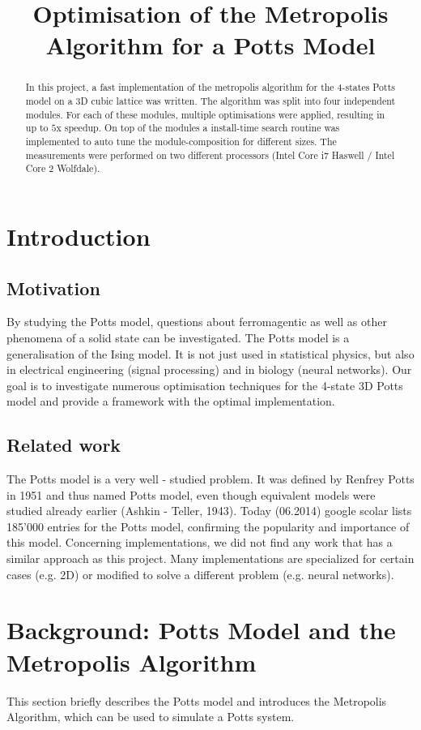 \documentclass[letterpaper]{article}
\title{Optimisation of the Metropolis Algorithm for a Potts Model}
\begin{document}
%
\maketitle
%


\begin{abstract}
In this project, a fast implementation of the metropolis algorithm for the 4-states Potts model on a 3D cubic lattice was written. The algorithm was split into four independent modules. For each of these modules, multiple optimisations were applied, resulting in up to $5$x speedup. On top of the modules a install-time search routine was implemented to auto tune the module-composition for different sizes. The measurements were performed on two different processors (Intel Core i7 Haswell / Intel Core 2 Wolfdale). 
\end{abstract}

\section{Introduction}\label{sec:intro}
\subsection{Motivation} 
By studying the Potts model, questions about ferromagentic as well as other phenomena of a solid state can be investigated. The Potts model is a generalisation of the Ising model. It is not just used in statistical physics, but also in electrical engineering (signal processing) and in biology (neural networks). Our goal is to investigate numerous optimisation techniques for the 4-state 3D Potts model and provide a framework with the optimal implementation. 
\subsection{Related work}
The Potts model is a very well - studied problem. It was defined by Renfrey Potts in 1951 and thus named Potts model, even though equivalent models were studied already earlier (Ashkin - Teller, 1943). Today (06.2014) google scolar lists 185'000 entries for the Potts model, confirming the popularity and importance of this model. Concerning implementations, we did not find any work that has a similar approach as this project. Many implementations are specialized for certain cases (e.g. 2D) or modified to solve a different problem (e.g. neural networks). 
\section{Background: Potts Model and the Metropolis Algorithm}\label{sec:background}
This section briefly describes the Potts model and introduces the Metropolis Algorithm, which can be used to simulate a Potts system.
\end{document}

